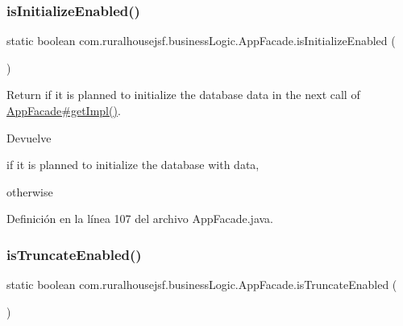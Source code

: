 \subsubsection{\texorpdfstring{isInitializeEnabled()}{isInitializeEnabled()}}
{\footnotesize\ttfamily static boolean com.\+ruralhousejsf.\+business\+Logic.\+App\+Facade.\+is\+Initialize\+Enabled (\begin{DoxyParamCaption}{ }\end{DoxyParamCaption})\hspace{0.3cm}{\ttfamily [static]}}



Return if it is planned to initialize the database data in the next call of \mbox{\hyperlink{classcom_1_1ruralhousejsf_1_1business_logic_1_1_app_facade_a029bcceee98b9070b9f80abc54db45d6}{App\+Facade\#get\+Impl()}}. 

\begin{DoxyReturn}{Devuelve}

\begin{DoxyCode}{0}
\DoxyCodeLine{\textcolor{keyword}{true} }
\end{DoxyCode}
 if it is planned to initialize the database with data,
\begin{DoxyCode}{0}
\DoxyCodeLine{\textcolor{keyword}{false} }
\end{DoxyCode}
 otherwise 
\end{DoxyReturn}


Definición en la línea 107 del archivo App\+Facade.\+java.

\mbox{\label{classcom_1_1ruralhousejsf_1_1business_logic_1_1_app_facade_a3638d881ea2d917df632a313d9ed9b20}} 
\subsubsection{\texorpdfstring{isTruncateEnabled()}{isTruncateEnabled()}}
{\footnotesize\ttfamily static boolean com.\+ruralhousejsf.\+business\+Logic.\+App\+Facade.\+is\+Truncate\+Enabled (\begin{DoxyParamCaption}{ }\end{DoxyParamCaption})\hspace{0.3cm}{\ttfamily [static]}}



